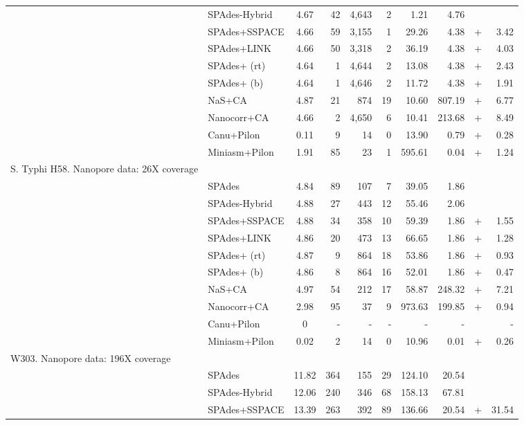 \begin{longtable}{llcrrrrr@{\hspace{2pt}}c@{\hspace{2pt}}r}
 & SPAdes-Hybrid & 4.67 & 42 & 4,643 & 2 & 1.21 & 4.76 &  & \\
 & SPAdes+SSPACE & 4.66 & 59 & 3,155 & 1 & 29.26 & 4.38 & + & 3.42 \\
 & SPAdes+LINK & 4.66 & 50 & 3,318 & 2 & 36.19 & 4.38 & + & 4.03 \\
 & SPAdes+\npscarf{} (rt) & 4.64 & 1 & 4,644 & 2 & 13.08 & 4.38 & + & 2.43 \\
 & SPAdes+\npscarf{} (b) & 4.64 & 1 & 4,646 & 2 & 11.72 & 4.38 & + & 1.91 \\
 & NaS+CA & 4.87 & 21 & 874 & 19 & 10.60 & 807.19 & + & 6.77 \\
 & Nanocorr+CA & 4.66 & 2 & 4,650 & 6 & 10.41 & 213.68 & + & 8.49 \\
 & Canu+Pilon & 0.11 & 9 & 14 & 0 & 13.90 & 0.79 & + & 0.28 \\
 & Miniasm+Pilon & 1.91 & 85 & 23 & 1 & 595.61 & 0.04 & + & 1.24 \\
\rowcolor{Gray} \multicolumn{10}{l}
{S. Typhi H58. Nanopore data:  26X coverage}\\ 
 & SPAdes & 4.84 & 89 & 107 & 7 & 39.05 & 1.86 &  & \\
 & SPAdes-Hybrid & 4.88 & 27 & 443 & 12 & 55.46 & 2.06 &  & \\
 & SPAdes+SSPACE & 4.88 & 34 & 358 & 10 & 59.39 & 1.86 & + & 1.55 \\
 & SPAdes+LINK & 4.86 & 20 & 473 & 13 & 66.65 & 1.86 & + & 1.28 \\
 & SPAdes+\npscarf{} (rt) & 4.87 & 9 & 864 & 18 & 53.86 & 1.86 & + & 0.93 \\
 & SPAdes+\npscarf{} (b) & 4.86 & 8 & 864 & 16 & 52.01 & 1.86 & + & 0.47 \\
 & NaS+CA & 4.97 & 54 & 212 & 17 & 58.87 & 248.32 & + & 7.21 \\
 & Nanocorr+CA & 2.98 & 95 & 37 & 9 & 973.63 & 199.85 & + & 0.94 \\
 & Canu+Pilon & 0 &  -  &  -  &  -  &  -  &  -  &  &  -  \\
 & Miniasm+Pilon & 0.02 & 2 & 14 & 0 & 10.96 & 0.01 & + & 0.26 \\
\rowcolor{Gray} \multicolumn{10}{l}
{ \sce{} W303. Nanopore data: 196X coverage}\\ 
 & SPAdes & 11.82 & 364 & 155 & 29 & 124.10 & 20.54 &  & \\
 & SPAdes-Hybrid & 12.06 & 240 & 346 & 68 & 158.13 & 67.81 &  & \\
 & SPAdes+SSPACE & 13.39 & 263 & 392 & 89 & 136.66 & 20.54 & + & 31.54 \\

\end{longtable}
